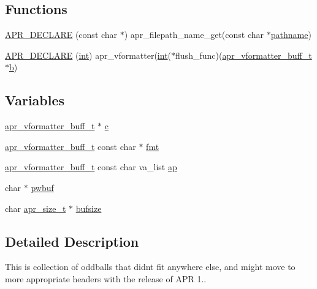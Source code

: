 \subsection*{Functions}
\begin{DoxyCompactItemize}
\item 
\hyperlink{group__apr__lib_gafc328be562cbf80885289214b616e86f}{A\+P\+R\+\_\+\+D\+E\+C\+L\+A\+RE} (const char $\ast$) apr\+\_\+filepath\+\_\+name\+\_\+get(const char $\ast$\hyperlink{group__APR__Util__DBM_gaf694cab4f4f6cd4b594af3c43cef1d0a}{pathname})
\item 
\hyperlink{group__apr__lib_gabfb3aa49508166a7d0cc70945b0164b7}{A\+P\+R\+\_\+\+D\+E\+C\+L\+A\+RE} (\hyperlink{pcre_8txt_a42dfa4ff673c82d8efe7144098fbc198}{int}) apr\+\_\+vformatter(\hyperlink{pcre_8txt_a42dfa4ff673c82d8efe7144098fbc198}{int}($\ast$flush\+\_\+func)(\hyperlink{structapr__vformatter__buff__t}{apr\+\_\+vformatter\+\_\+buff\+\_\+t} $\ast$\hyperlink{group__APR__Util__Bucket__Brigades_ga11dc1bdeac74315dbed17465c98879e9}{b})
\end{DoxyCompactItemize}
\subsection*{Variables}
\begin{DoxyCompactItemize}
\item 
\hyperlink{structapr__vformatter__buff__t}{apr\+\_\+vformatter\+\_\+buff\+\_\+t} $\ast$ \hyperlink{group__apr__lib_ga0823c5d125363d133fed61fb69c69cdd}{c}
\item 
\hyperlink{structapr__vformatter__buff__t}{apr\+\_\+vformatter\+\_\+buff\+\_\+t} const char $\ast$ \hyperlink{group__apr__lib_ga0675cea1fc084bc705a06e8f2a1ccc98}{fmt}
\item 
\hyperlink{structapr__vformatter__buff__t}{apr\+\_\+vformatter\+\_\+buff\+\_\+t} const char va\+\_\+list \hyperlink{group__apr__lib_gaaa28ecbd6731301051402d429bfb8540}{ap}
\item 
char $\ast$ \hyperlink{group__apr__lib_gac94b4a094f5865d6a5d4a7b04929e528}{pwbuf}
\item 
char \hyperlink{group__apr__platform_gaaa72b2253f6f3032cefea5712a27540e}{apr\+\_\+size\+\_\+t} $\ast$ \hyperlink{group__apr__lib_ga423d6c42d72a554fc31208493f49913e}{bufsize}
\end{DoxyCompactItemize}


\subsection{Detailed Description}
This is collection of oddballs that didn\textquotesingle{}t fit anywhere else, and might move to more appropriate headers with the release of A\+PR 1.. 

